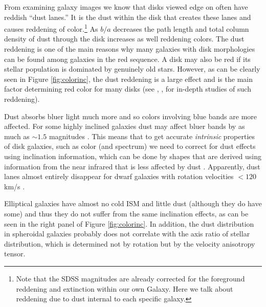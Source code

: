 From examining galaxy images we know that disks viewed edge on often have reddish ``dust lanes.'' It is the dust within the disk that creates these lanes and causes reddening of color.\footnote{Note that the SDSS magnitudes are already corrected for the foreground reddening and extinction within our own Galaxy. Here we talk about reddening due to dust internal to each specific galaxy.} As $b/a$ decreases the path length and total column density of dust through the disk increases as well reddening colors. The dust reddening is one of the main reasons why many galaxies with disk morphologies can be found among galaxies in the red sequence. A disk may also be red if its stellar population is dominated by genuinely old stars. However, as can be clearly seen in 
Figure \ref{fig:colorinc}, the dust reddening is a large effect and is the main factor determining red color for many disks (see \href{http://adsabs.harvard.edu/abs/2007MNRAS.379.1022D}{\citealt{driver_etal07}}, \href{http://adsabs.harvard.edu/abs/2008ApJ...687..976U}{\citealt{unterborn_ryden08}}, \href{http://adsabs.harvard.edu/abs/2009ApJ...691..394M}{\citealt{maller_etal09}} for in-depth studies of such reddening). 

Dust absorbs bluer light much more and so colors involving blue bands are more affected. For some highly inclined galaxies dust may affect bluer bands by as much as $\sim 1.5$ magnitudes \citep{driver_etal07,maller_etal09}. This means that to get accurate {\it intrinsic} properties of disk galaxies, such as color (and spectrum) we need to correct for dust effects using inclination information, which can be done by shapes that are derived using information from the near infrared that is less affected by dust \citep{maller_etal09}. Apparently, dust lanes almost entirely disappear for dwarf galaxies with rotation velocities $<120$ km/s \href{http://adsabs.harvard.edu/abs/2006AJ....131..226Y}{\citep{yoachim_dalcanton06}}.  

Elliptical galaxies have almost no cold ISM and little dust (although they do have some) and thus they do not suffer from the same inclination effects, as can be seen in the right panel of Figure \ref{fig:colorinc}. In addition, the dust distribution in spheroidal galaxies probably does not correlate with the axis ratio of stellar distribution, which is determined not by rotation but by the velocity anisotropy tensor. 

